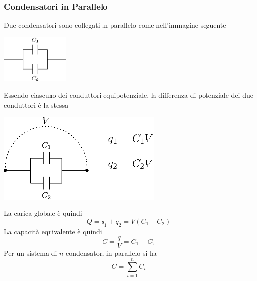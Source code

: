 \documentclass[10pt, letterpaper]{report}
\begin{document}
\subsubsection{Condensatori in Parallelo}
Due condensatori sono collegati in parallelo come nell'immagine seguente\begin{center}
    \includegraphics[width=0.25\textwidth]{images/condParallelo.eps}
\end{center} 
Essendo ciascuno dei conduttori equipotenziale, la differenza di potenziale dei due conduttori è la stessa\begin{center}
    \includegraphics[width=0.6\textwidth]{images/condParallelo2.eps}
\end{center} 
La carica globale è quindi 
$$ Q=q_1+q_2=V(C_1+C_2)$$
La capacità equivalente è quindi 
$$ C=\frac{q}{V}=C_1+C_2$$
Per un sistema di $n$ condensatori in parallelo si ha 
$$ C=\sum_{i=1}^nC_i$$
\end{document}
